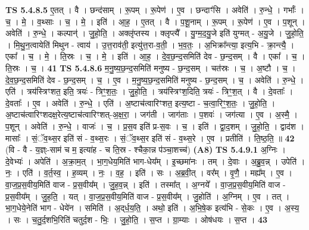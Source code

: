 \documentclass[17pt]{extarticle}
\begin{document}
                                \textbf{ TS 5.4.8.5} \newline
                  ए॒तत् । वै । छन्द॑साम् । रू॒पम् । रू॒पेण॑ । ए॒व । छन्दाꣳ॑सि । अवेति॑ । रु॒न्धे॒ । गर्भाः᳚ । च॒ । मे॒ । व॒थ्साः । च॒ । मे॒ । इति॑ । आ॒ह॒ । ए॒तत् । वै । प॒शू॒नाम् । रू॒पम् । रू॒पेण॑ । ए॒व । प॒शून् । अवेति॑ । रु॒न्धे॒ । कल्पान्॑ । जु॒हो॒ति॒ । अक्लृ॑प्तस्य । क्लृप्त्यै᳚ । यु॒ग्म॒द॒यु॒जे इति॑ युग्मत् - अ॒यु॒जे । जु॒हो॒ति॒ । मि॒थु॒न॒त्वायेति॑ मिथुन - त्वाय॑ । उ॒त्त॒राव॑ती॒ इत्यु॑त्त॒रा-व॒ती॒ । भ॒व॒तः॒ । अ॒भिक्रा᳚न्त्या॒ इत्य॒भि - क्रा॒न्त्यै॒ । एका᳚ । च॒ । मे॒ । ति॒स्रः । च॒ । मे॒ । इति॑ । आ॒ह॒ । दे॒व॒छ॒न्द॒समिति॑ देव - छ॒न्द॒सम् । वै । एका᳚ । च॒ । ति॒स्रः । च॒ । \textbf{  41} \newline
                  \newline
                                \textbf{ TS 5.4.8.6} \newline
                  म॒नु॒ष्य॒छ॒न्द॒समिति॑ मनुष्य - छ॒न्द॒सम् । चत॑स्रः । च॒ । अ॒ष्टौ । च॒ । दे॒व॒छ॒न्द॒समिति॑ देव - छ॒न्द॒सम् । च॒ । ए॒व । म॒नु॒ष्य॒छ॒न्द॒समिति॑ मनुष्य - छ॒न्द॒सम् । च॒ । अवेति॑ । रु॒न्धे॒ । एति॑ । त्रय॑स्त्रिꣳशत॒ इति॒ त्रयः॑ - त्रिꣳ॒॒श॒तः॒ । जु॒हो॒ति॒ । त्रय॑स्त्रिꣳश॒दिति॒ त्रयः॑ - त्रिꣳ॒॒श॒त् । वै । दे॒वताः᳚ । दे॒वताः᳚ । ए॒व । अवेति॑ । रु॒न्धे॒ । एति॑ । अ॒ष्टाच॑त्वारिꣳशत॒ इत्य॒ष्टा - च॒त्वा॒रिꣳ॒॒श॒तः॒ । जु॒हो॒ति॒ । अ॒ष्टाच॑त्वारिꣳशदक्ष॒रेत्य॒ष्टाच॑त्वारिꣳशत्-अ॒क्ष॒रा॒ । जग॑ती । जाग॑ताः । प॒शवः॑ । जग॑त्या । ए॒व । अ॒स्मै॒ । प॒शून् । अवेति॑ । रु॒न्धे॒ । वाजः॑ । च॒ । प्र॒स॒व इति॑ प्र-स॒वः । च॒ । इति॑ । द्वा॒द॒शम् । जु॒हो॒ति॒ । द्वाद॑श । मासाः᳚ । सं॒ॅव॒थ्स॒र इति॑ सं - व॒थ्स॒रः । सं॒ॅव॒थ्स॒र इति॑ सं - व॒थ्स॒रे । ए॒व । प्रतीति॑ । ति॒ष्ठ॒ति॒ ॥ \textbf{  42} \newline
                  \newline
                      (वि - वै - य॒ज्ञ्ः-साम॑ च म॒ इत्या॑ह - च ति॒स्र - श्चैका॒न्न प॑ञ्चा॒शच्च॑)  \textbf{(A8)} \newline \newline
                                \textbf{ TS 5.4.9.1} \newline
                  अ॒ग्निः । दे॒वेभ्यः॑ । अपेति॑ । अ॒क्रा॒म॒त् । भा॒ग॒धेय॒मिति॑ भाग-धेय᳚म् । इ॒च्छमा॑नः । तम् । दे॒वाः । अ॒ब्रु॒व॒न्न् । उपेति॑ । नः॒ । एति॑ । व॒र्त॒स्व॒ । ह॒व्यम् । नः॒ । व॒ह॒ । इति॑ । सः । अ॒ब्र॒वी॒त् । वर᳚म् । वृ॒णै॒ । मह्य᳚म् । ए॒व । वा॒ज॒प्र॒स॒वीय॒मिति॑ वाज - प्र॒स॒वीय᳚म् । जु॒ह॒व॒न्न् । इति॑ । तस्मा᳚त् । अ॒ग्नये᳚ । वा॒ज॒प्र॒स॒वीय॒मिति॑ वाज - प्र॒स॒वीय᳚म् । जु॒ह॒ति॒ । यत् । वा॒ज॒प्र॒स॒वीय॒मिति॑ वाज - प्र॒स॒वीय᳚म् । जु॒होति॑ । अ॒ग्निम् । ए॒व । तत् । भा॒ग॒धेये॒नेति॑ भाग - धेये॑न । समिति॑ । अ॒द्‌र्ध॒य॒ति॒ । अथो॒ इति॑ । अ॒भि॒षे॒क इत्य॑भि - से॒कः । ए॒व । अ॒स्य॒ । सः । च॒तु॒र्द॒शभि॒रिति॑ चतुर्द॒श - भिः॒ । जु॒हो॒ति॒ । स॒प्त । ग्रा॒म्याः । ओष॑धयः । स॒प्त । \textbf{  43} \newline
\end{document}
